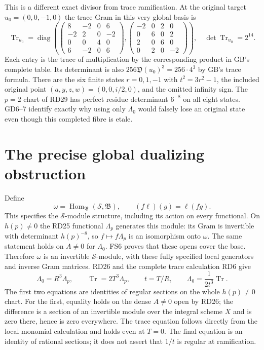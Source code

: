 \documentclass[11pt]{article}
\begin{document}
This is a different exact divisor from trace ramification.
At the original target $u_0=(0,0,-1,0)$ the trace Gram in
this very global basis is
\begin{equation}
 \operatorname{Tr}_{u_0}=\operatorname{diag}\left(
 \begin{pmatrix}8&-2&0&6\\-2&2&0&-2\\0&0&4&0\\6&-2&0&6\end{pmatrix},
 \begin{pmatrix}-2&0&2&0\\0&6&0&2\\2&0&6&0\\0&2&0&-2\end{pmatrix}\right),
 \quad\det\operatorname{Tr}_{u_0}=2^{14}.
 \tag{GD7}
\end{equation}
Each entry is the trace of multiplication by the corresponding
product in GB's complete table. Its determinant is also
$256\mathfrak D(u_0)^3=256\cdot4^3$ by GB's trace formula.
There are the six finite states $r=0,1,-1$ with
$t^2=3r^2-1$, the included original point
$(a,y,z,w)=(0,0,i/2,0)$, and the omitted infinity sign.
The $p=2$ chart of RD29 has perfect residue determinant
$6^{-8}$ on all eight states. GD6--7 identify exactly why
using only $\Lambda_0$ would falsely lose an original state
even though this completed fibre is etale.

\section{The precise global dualizing obstruction}
Define
\begin{equation}
 \omega=\operatorname{Hom}_{\mathfrak B}(\mathscr S,\mathfrak B),
 \qquad (f\ell)(g)=\ell(fg).
 \tag{GD8}
\end{equation}
This specifies the $\mathscr S$-module structure, including
its action on every functional. On $h(p)\ne0$ the RD25
functional $\Lambda_p$ generates this module: its Gram is
invertible with determinant $h(p)^{-8}$, so
$f\mapsto f\Lambda_p$ is an isomorphism onto $\omega$.
The same statement holds on $A\ne0$ for $\Lambda_0$.
FS6 proves that these opens cover the base. Therefore
$\omega$ is an invertible $\mathscr S$-module, with these
fully specified local generators and inverse Gram matrices.
RD26 and the complete trace calculation RD6 give
\begin{equation}
 \Lambda_0=R^3\Lambda_p,\qquad
 \operatorname{Tr}=2T^3\Lambda_p,\qquad
 t=T/R,\qquad
 \Lambda_0=\frac{1}{2t^3}\operatorname{Tr}.
 \tag{GD9}
\end{equation}
The first two equations are identities of regular sections
on the whole $h(p)\ne0$ chart. For the first, equality
holds on the dense $A\ne0$ open by RD26; the difference
is a section of an invertible module over the integral
scheme $X$ and is zero there, hence is zero everywhere.
The trace equation follows directly from the local
monomial calculation and holds even at $T=0$.
The final equation is an identity of rational sections;
it does not assert that $1/t$ is regular at ramification.
\end{document}
